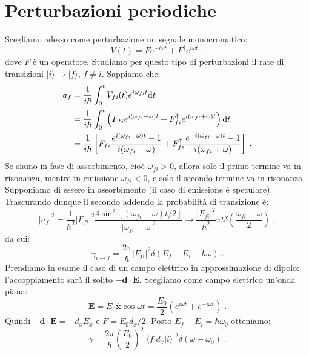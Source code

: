 \documentclass[10pt,a4paper]{report}
\theoremstyle{definition}
\numberwithin{equation}{section}
\newcommand{\diff}[1][]{\mathrm{d}#1}
\newcommand{\bra}{\langle}
\newcommand{\ket}{\rangle}
\newcommand{\adj}[1]{#1^{\dagger}}
\begin{document}
\section{Perturbazioni periodiche}
Scegliamo adesso come perturbazione un segnale monocromatico:
\begin{equation}
V(t)=Fe^{-i\omega t}+\adj{F}e^{i\omega t}\;,
\end{equation}
dove $F$ è un operatore. Studiamo per questo tipo di perturbazioni il rate di transizioni $|i\ket\to|f\ket$, $f\ne i$. Sappiamo che:
\begin{align}
a_f&=\frac{1}{i\hbar}\int_0^t V_{fi}(t)e^{i\omega_{fi}t}\diff{t} \notag \\
&=\frac{1}{i\hbar}\int_0^t\left(F_{fi}e^{i(\omega_{fi}-\omega)t}+\adj{F}_{fi}e^{i(\omega_{fi}+\omega)t}\right)\diff{t} \notag \\
&= \frac{1}{i\hbar}\left[ F_{fi}\frac{e^{i(\omega_{fi}-\omega)t}-1}{i(\omega_{fi}-\omega)}+\adj{F}_{fi}\frac{e^{-i(\omega_{fi}+\omega)t}-1}{i(\omega_{fi}+\omega)}\right]\;.
\end{align}
Se siamo in fase di assorbimento, cioè $\omega_{fi}>0$, allora solo il primo termine va in risonanza, mentre in emissione $\omega_{fi}<0$, e solo il secondo termine va in risonanza. Supponiamo di essere in assorbimento (il caso di emissione è speculare). Trascurando dunque il secondo addendo la probabilità di transizione è:
\begin{equation}
|a_f|^2=\frac{1}{\hbar^2}|F_{fi}|^2\frac{4\sin^2[(\omega_{fi}-\omega)t/2]}{|\omega_{fi}-\omega|^2} \longrightarrow \frac{|F_{fi}|^2}{\hbar^2}\pi t\delta\left(\frac{\omega_{fi}-\omega}{2}\right)\;,
\end{equation}
da cui:
\begin{equation}
\gamma_{i\to f}=\frac{2\pi}{\hbar}|F_{fi}|^2\delta(E_f-E_i-\hbar\omega)\;.
\end{equation}
Prendiamo in esame il caso di un campo elettrico in approssimazione di dipolo: l'accoppiamento sarà il solito $-\mathbf{d}\cdot\mathbf{E}$. Scegliamo come campo elettrico un'onda piana:
\begin{equation}
\mathbf{E}=E_0\hat{\mathbf{x}}\cos\omega t=\frac{E_0}{2}(e^{i\omega t}+e^{-i\omega t})\;.
\end{equation}
Quindi $-\mathbf{d}\cdot\mathbf{E}=-d_xE_x$ e $F=E_0d_x/2$. Posto $E_f-E_i=\hbar\omega_0$ otteniamo:
\begin{equation}
\gamma= \frac{2\pi}{\hbar}\left(\frac{E_0}{2}\right)^2|\bra f|d_x|i\ket|^2\delta(\omega-\omega_0)\;.
\end{equation}
\end{document}
